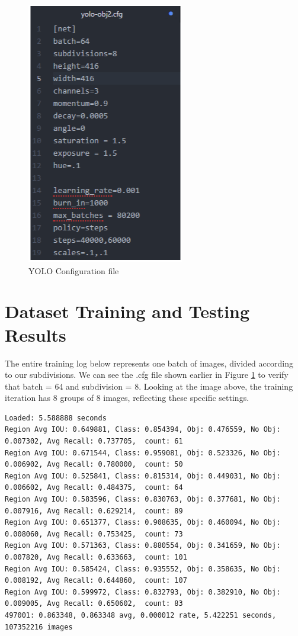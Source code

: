 \vspace{15mm}
\begin{figure}[h]
\centering
\includegraphics[scale=0.87]{figures/cfg_file.png}
\caption{YOLO Configuration file}
\label{cfg_file}
\end{figure}

\newpage
\section{Dataset Training and Testing Results}
\vspace{5mm}
The entire training log below represents one batch of images, divided according to our subdivisions. We can see the .cfg file shown earlier in Figure \ref{cfg_file} to verify that batch = 64 and subdivision = 8. Looking at the image above, the training iteration has 8 groups of 8 images, reflecting these specific settings.

\vspace{5mm}
\begin{lstlisting}
Loaded: 5.588888 seconds
Region Avg IOU: 0.649881, Class: 0.854394, Obj: 0.476559, No Obj: 0.007302, Avg Recall: 0.737705,  count: 61
Region Avg IOU: 0.671544, Class: 0.959081, Obj: 0.523326, No Obj: 0.006902, Avg Recall: 0.780000,  count: 50
Region Avg IOU: 0.525841, Class: 0.815314, Obj: 0.449031, No Obj: 0.006602, Avg Recall: 0.484375,  count: 64
Region Avg IOU: 0.583596, Class: 0.830763, Obj: 0.377681, No Obj: 0.007916, Avg Recall: 0.629214,  count: 89
Region Avg IOU: 0.651377, Class: 0.908635, Obj: 0.460094, No Obj: 0.008060, Avg Recall: 0.753425,  count: 73
Region Avg IOU: 0.571363, Class: 0.880554, Obj: 0.341659, No Obj: 0.007820, Avg Recall: 0.633663,  count: 101
Region Avg IOU: 0.585424, Class: 0.935552, Obj: 0.358635, No Obj: 0.008192, Avg Recall: 0.644860,  count: 107
Region Avg IOU: 0.599972, Class: 0.832793, Obj: 0.382910, No Obj: 0.009005, Avg Recall: 0.650602,  count: 83
497001: 0.863348, 0.863348 avg, 0.000012 rate, 5.422251 seconds, 107352216 images
\end{lstlisting}


